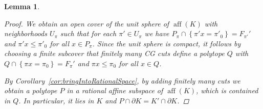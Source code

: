 \documentclass[11pt]{article}
\newtheorem{lem}[thm]{Lemma}
\theoremstyle{remark}
\begin{document}
\begin{lem}
\begin{proof}
We obtain an open cover of the unit
sphere of \({\operatorname{aff}({K})}\) with neighborhoods \(U_\pi\)
such that for each \(\pi' \in U_\pi\)
we have
\(P_{\pi} \cap {\left\{{ \pi' x = \pi'_0}\right\}} = F_{\pi'}'\)
and \(\pi' x \leq \pi'_{0}\) for all \(x \in P_{\pi}\).
Since the unit sphere is compact,
it follows by choosing a finite subcover that
finitely many {CG\xspace} cuts define a polytope \(Q\)
with
\(Q \cap {\left\{{ \pi x = \pi_0}\right\}} = F_{\pi}'\)
and \(\pi x \leq \pi_{0}\) for all \(x \in Q\).

By Corollary~\ref{cor:bringIntoRationalSpace},
by adding finitely many cuts
we obtain a polytope \(P\) in a rational affine subspace of \({\operatorname{aff}({K})}\),
which is contained in \(Q\).
In particular, it lies in \(K\) and
\(P \cap \partial K = K' \cap \partial K\).
\end{proof}
\end{lem}
\end{document}
